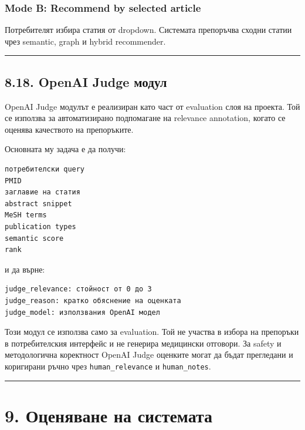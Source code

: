 \documentclass[12pt,a4paper]{article}
\begin{document}
\subsubsection{Mode B: Recommend by selected article}\label{mode-b-recommend-by-selected-article}

Потребителят избира статия от dropdown. Системата препоръчва сходни статии чрез semantic, graph и hybrid recommender.

\vspace{0.5em}\hrule\vspace{1.0em}

\subsection{8.18. OpenAI Judge модул}\label{openai-judge-ux43cux43eux434ux443ux43b}

OpenAI Judge модулът е реализиран като част от evaluation слоя на проекта. Той се използва за автоматизирано подпомагане на relevance annotation, когато се оценява качеството на препоръките.

Основната му задача е да получи:

\begin{verbatim}
потребителски query
PMID
заглавие на статия
abstract snippet
MeSH terms
publication types
semantic score
rank
\end{verbatim}

и да върне:

\begin{verbatim}
judge_relevance: стойност от 0 до 3
judge_reason: кратко обяснение на оценката
judge_model: използвания OpenAI модел
\end{verbatim}

Този модул се използва само за evaluation. Той не участва в избора на препоръки в потребителския интерфейс и не генерира медицински отговори. За safety и методологична коректност OpenAI Judge оценките могат да бъдат прегледани и коригирани ръчно чрез \texttt{human\_relevance} и \texttt{human\_notes}.

\vspace{0.5em}\hrule\vspace{1.0em}

\section{9. Оценяване на системата}\label{ux43eux446ux435ux43dux44fux432ux430ux43dux435-ux43dux430-ux441ux438ux441ux442ux435ux43cux430ux442ux430}
\end{document}
